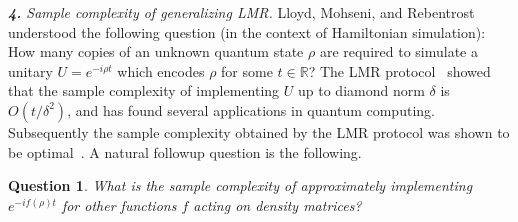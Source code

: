 \documentclass[11pt]{article}
\newcommand{\R}{\ensuremath{\mathbb{R}}}
\newtheorem{question}{Question}
\begin{document}
\emph{\textbf{4.} Sample complexity of generalizing LMR.}  Lloyd, Mohseni, and Rebentrost~\cite{Lloyd2014} understood the following question (in the context of Hamiltonian simulation): 
How many copies of an unknown quantum state $\rho$ are required to simulate a unitary $U=e^{-i\rho t}$ which encodes $\rho$ for some $t\in \R$? The LMR protocol~\cite{Lloyd2014} showed that the sample complexity of implementing $U$ up to diamond norm $\delta$ is $O(t/\delta^2)$, and has found several applications in quantum computing. Subsequently the sample complexity obtained by the LMR protocol was shown to be optimal~\cite{kimmel2017hamiltonian}. A natural followup question is the following.
\begin{question}
     What is the sample complexity of approximately implementing $e^{-i f(\rho) t}$ for other functions $f$ acting on density matrices?
\end{question}
\end{document}
